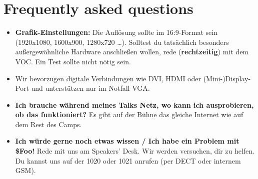 \documentclass[paper=a4]{scrartcl}
\begin{document}
\section*{Frequently asked questions}
\begin{itemize}
	\item \textbf{Grafik-Einstellungen:} Die Auflösung sollte im 16:9-Format sein (1920x1080, 1600x900, 1280x720 \ldots). Solltest du tatsächlich besonders außergewöhnliche Hardware anschließen wollen, rede (\textbf{rechtzeitig}) mit dem VOC. Ein Test sollte nicht nötig sein.
	\item Wir bevorzugen digitale Verbindungen wie DVI, HDMI oder (Mini-)Display-Port und unterstützen nur im Notfall VGA.
	\item \textbf{Ich brauche während meines Talks Netz, wo kann ich ausprobieren, ob das funktioniert?} Es gibt auf der Bühne das gleiche Internet wie auf dem Rest des Camps.
	\item \textbf{Ich würde gerne noch etwas wissen / Ich habe ein Problem mit \$Foo!} Rede mit uns am Speakers' Desk. Wir werden versuchen, dir zu helfen. Du kannst uns auf der 1020 oder 1021 anrufen (per DECT oder internem GSM).
\end{itemize}
\end{document}
